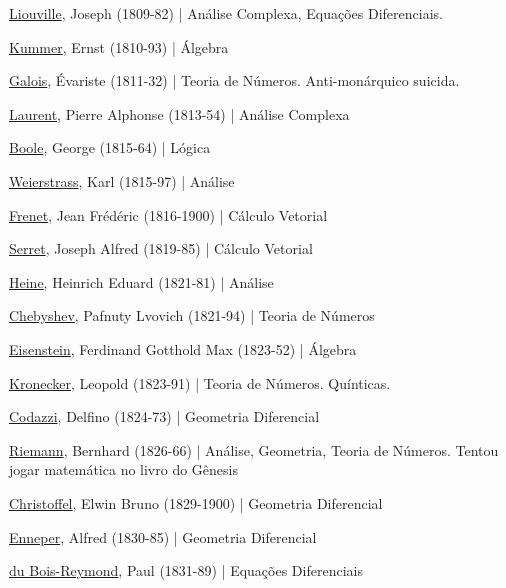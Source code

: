 \documentclass[12pt,a4paper]{article}
\begin{document}
			\href{http://en.wikipedia.org/wiki/Liouville}{Liouville}, Joseph (1809-82) | An\'alise Complexa, Equa\c{c}\~oes Diferenciais.

			\href{http://en.wikipedia.org/wiki/Ernst_Kummer}{Kummer}, Ernst (1810-93) | \'Algebra

			\href{http://pt.wikipedia.org/wiki/\'Evariste_Galois}{Galois}, \'Evariste (1811-32) | Teoria de N\'umeros. Anti-mon\'arquico suicida.

			\href{http://en.wikipedia.org/wiki/Pierre_Alphonse_Laurent}{Laurent}, Pierre Alphonse (1813-54) | An\'alise Complexa

			\href{http://pt.wikipedia.org/wiki/George_Boole}{Boole}, George (1815-64) | L\'ogica

			\href{http://pt.wikipedia.org/wiki/Karl_Weierstrass}{Weierstrass}, Karl (1815-97) | An\'alise

			\href{http://en.wikipedia.org/wiki/Jean_Fr\%C3\%A9d\%C3\%A9ric_Frenet}{Frenet}, Jean Fr\'ed\'eric (1816-1900) | C\'alculo Vetorial

			\href{http://en.wikipedia.org/wiki/Joseph_Alfred_Serret}{Serret}, Joseph Alfred (1819-85) | C\'alculo Vetorial

			\href{http://en.wikipedia.org/wiki/Eduard_Heine}{Heine}, Heinrich Eduard (1821-81) | An\'alise

			\href{http://en.wikipedia.org/wiki/Chebyshev_function}{Chebyshev}, Pafnuty Lvovich (1821-94) | Teoria de N\'umeros

			\href{http://en.wikipedia.org/wiki/Ferdinand_Eisenstein}{Eisenstein}, Ferdinand Gotthold Max (1823-52) | \'Algebra

			\href{http://en.wikipedia.org/wiki/Kronecker}{Kronecker}, Leopold (1823-91) | Teoria de N\'umeros. Qu\'inticas.

			\href{http://en.wikipedia.org/wiki/Delfino_Codazzi}{Codazzi}, Delfino (1824-73) | Geometria Diferencial

			\href{http://pt.wikipedia.org/wiki/Bernhard_Riemann}{Riemann}, Bernhard (1826-66) | An\'alise, Geometria, Teoria de N\'umeros. Tentou jogar matem\'atica no livro do G\^enesis

			\href{http://en.wikipedia.org/wiki/Christoffel}{Christoffel}, Elwin Bruno (1829-1900) | Geometria Diferencial

			\href{http://en.wikipedia.org/wiki/Alfred_Enneper}{Enneper}, Alfred (1830-85) | Geometria Diferencial

			\href{http://pt.wikipedia.org/wiki/Paul_du_Bois-Reymond}{du Bois-Reymond}, Paul (1831-89) | Equa\c{c}\~oes Diferenciais
\end{document}
